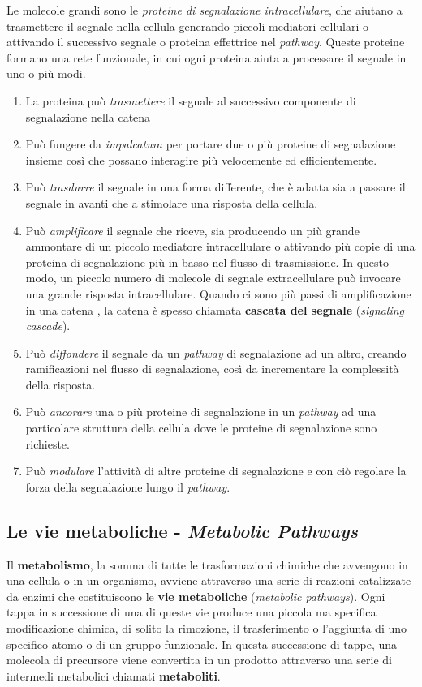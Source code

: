 Le molecole grandi sono le \textit{proteine di segnalazione intracellulare}, che aiutano a trasmettere il segnale nella cellula generando piccoli mediatori cellulari o attivando il successivo segnale o proteina effettrice nel \textit{pathway}.
Queste proteine formano una rete funzionale, in cui ogni proteina aiuta a processare il segnale in uno o più modi.
\begin{enumerate}
\item La proteina può \textit{trasmettere} il segnale al successivo componente di segnalazione nella catena
\item Può fungere da \textit{impalcatura} per portare due o più proteine di segnalazione insieme così che possano interagire più velocemente ed efficientemente.
\item Può \textit{trasdurre} il segnale in una forma differente, che è adatta sia a passare il segnale in avanti che a stimolare una risposta della cellula.
\item Può \textit{amplificare} il segnale che riceve, sia producendo un più grande ammontare di un piccolo mediatore intracellulare  o attivando più copie di una proteina di segnalazione più in basso nel flusso di trasmissione. In questo modo, un piccolo numero di molecole di segnale extracellulare può invocare una grande risposta intracellulare. Quando ci sono più passi di amplificazione in una catena , la catena è spesso chiamata \textbf{cascata del segnale} (\textit{signaling cascade}).
\item Può \textit{diffondere} il segnale da un \textit{pathway} di segnalazione ad un altro, creando ramificazioni nel flusso di segnalazione, così da incrementare la complessità della risposta.
\item Può \textit{ancorare} una o più proteine di segnalazione in un \textit{pathway} ad una particolare struttura della cellula dove le proteine di segnalazione sono richieste.
\item Può \textit{modulare} l'attività di altre proteine di segnalazione e con ciò regolare la forza della segnalazione lungo il \textit{pathway}.
\end{enumerate}

\subsection{Le vie metaboliche - \textit{Metabolic Pathways}}
\label{sec:metabolic}
Il \textbf{metabolismo}, la somma di tutte le trasformazioni chimiche che avvengono in una cellula o in un organismo, avviene attraverso una serie di reazioni catalizzate da enzimi che costituiscono le \textbf{vie metaboliche} (\textit{metabolic pathways}).
Ogni tappa in successione di una di queste vie produce una piccola ma specifica modificazione chimica, di solito la rimozione, il trasferimento o l'aggiunta di uno specifico atomo o di un gruppo funzionale.
In questa successione di tappe, una molecola di precursore viene convertita in un prodotto attraverso una serie di intermedi metabolici chiamati \textbf{metaboliti}.\cite{nelsonprincipi}

